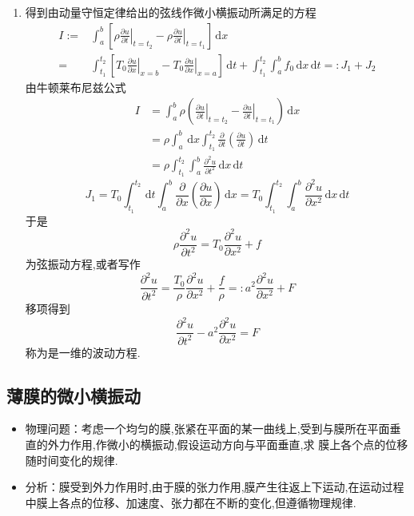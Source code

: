 \documentclass[../../PDE.tex]{subfiles}
\begin{document}
\begin{enumerate}
\item 得到由动量守恒定律给出的弦线作微小横振动所满足的方程 \[
\begin{aligned}
I := & \int_{a}^{b}\left[ \left. \rho \frac{\partial u}{\partial t}     \right|_{t= t_2} - \left. \rho \frac{\partial u}{\partial t} \right|_{t= t_1} \right]\,\mathrm{d} x\\ 
 = &  \int_{t_1}^{t_2}\left[ \left. T_0\frac{\partial u}{\partial x} \right|_{x= b} -\left. T_0\frac{\partial u}{\partial x} \right|_{x= a} \right]\,\mathrm{d} t+  \int_{t_1}^{t_2} \int_{a}^{b}f_0\,\mathrm{d} x\,\mathrm{d} t = :J_1+ J_2
\end{aligned}
\]由牛顿莱布尼兹公式 \[
\begin{aligned}
I& =  \int_{a}^{b}\rho \left( \left. \frac{\partial u}{\partial t} \right|_{t= t_2}- \left. \frac{\partial u}{\partial t} \right|_{t= t_1} \right) \,\mathrm{d} x\\ 
 & =  \rho \int_{a}^{b}\,\mathrm{d} x \int_{t_1}^{t_2}\frac{\partial }{\partial t}\left( \frac{\partial u}{\partial t} \right)\,\mathrm{d} t\\ 
  & =  \rho \int_{t_1}^{t_2}\int_{a}^{b} \frac{\partial ^{2}u}{\partial t^{2}}\,\mathrm{d} x\,\mathrm{d} t  
\end{aligned}
\] \[
J_1=  T_0\int_{t_1}^{t_2}\,\mathrm{d} t\int_{a}^{b} \frac{\partial }{\partial x}\left( \frac{\partial u}{\partial x} \right)\,\mathrm{d} x=  T_0\int_{t_1}^{t_2}\int_{a}^{b}\frac{\partial ^{2}u}{\partial x^{2}}\,\mathrm{d} x\,\mathrm{d} t 
\]于是 \[
\rho  \frac{\partial ^{2}u}{\partial t^{2}}= T_0 \frac{\partial ^{2}u}{\partial x^{2}} + f
\]为弦振动方程,或者写作 \[
\frac{\partial ^{2}u}{\partial t^{2}} =  \frac{T_0 }{\rho  } \frac{\partial ^{2}u}{\partial x^{2}}+  \frac{f }{\rho  }= : a^{2}\frac{\partial ^{2}u}{\partial x^{2}}+ F  
\]移项得到 \[
\frac{\partial ^{2}u}{\partial t^{2}} -a^{2} \frac{\partial ^{2}u}{\partial x^{2}}= F
\]称为是一维的波动方程.

\end{enumerate}

\subsection{薄膜的微小横振动}

\begin{itemize}
    \item 物理问题：考虑一个均匀的膜,张紧在平面的某一曲线上,受到与膜所在平面垂直的外力作用,作微小的横振动,假设运动方向与平面垂直,求
    膜上各个点的位移随时间变化的规律.
    \item 分析：膜受到外力作用时,由于膜的张力作用,膜产生往返上下运动,在运动过程中膜上各点的位移、加速度、张力都在不断的变化,但遵循物理规律.
\end{itemize}
\end{document}
